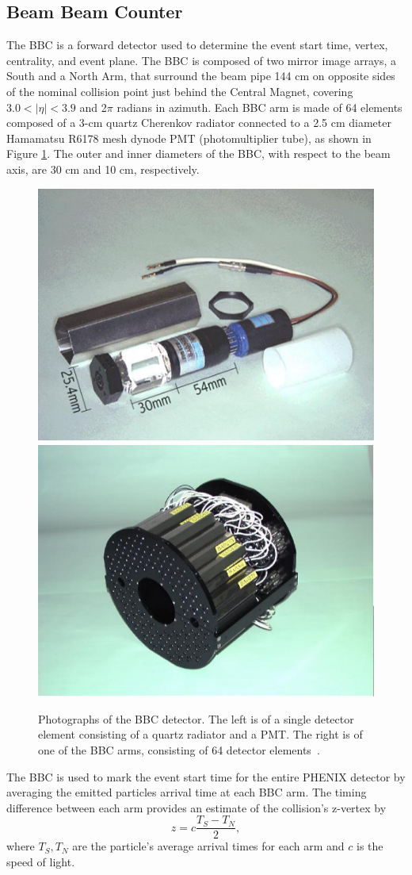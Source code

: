 \subsection{Beam Beam Counter}
\label{sec:bbc_det_sec}
The BBC is a forward detector used to determine the event start time, vertex, centrality, and event plane. The BBC is composed of two mirror image arrays, a South and a North Arm, that surround the beam pipe 144 cm on opposite sides of the nominal collision point just behind the Central Magnet, covering $3.0 < |\eta| < 3.9$ and 2$\pi$ radians in azimuth. Each BBC arm is made of 64 elements composed of a 3-cm quartz Cherenkov radiator connected to a 2.5 cm diameter Hamamatsu R6178 mesh dynode PMT (photomultiplier tube), as shown in Figure \ref{fig:bbc_dector}. The outer and inner diameters of the BBC, with respect to the beam axis, are 30 cm and 10 cm, respectively.%
\begin{figure}[!ht]
\centering
\includegraphics[width=0.45\linewidth]{figs/bbc_pmt.png}
\includegraphics[width=0.45\linewidth]{figs/bbc_arm.png}
\caption{Photographs of the BBC detector. The left is of a single detector element consisting of a quartz radiator and a PMT. The right is of one of the BBC arms, consisting of 64 detector elements~\cite{Adcox2003469}.}
\label{fig:bbc_dector}
\end{figure}

The BBC is used to mark the event start time for the entire PHENIX detector by averaging the emitted particles arrival time at each BBC arm. The timing difference between each arm provides an estimate of the collision's z-vertex by
\begin{equation}
z = c \frac{T_S - T_N}{2},
\end{equation}
where $T_S, T_N$ are the particle's average arrival times for each arm and $c$ is the speed of light.%

